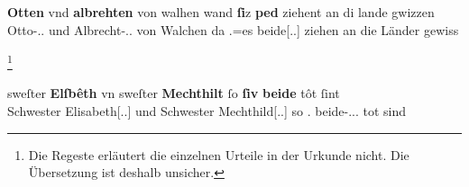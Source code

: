 \begin{exe}
\ex \label{ex:cao_samegend_beide}
\begin{xlist}

	\ex \label{ex:cao_samegend_beide_2}
		\gll \textbf{Otten} vnd \textbf{albrehten} von walhen \textelp{} wand
			\textbf{ſi}z \textbf{ped} ziehent an di lande gwizzen \\
			Otto-\Acc.\Sg.\MascM{} und Albrecht-\Acc.\Sg.\MascM{} von Walchen
			{} da \Tpl\subM.\Nom{}=es beide[\Nom.\Pl.\MascM] ziehen an die
			Länder gewiss \\
		\begin{taggedline}{\parencites(Salzburg, 1281)[\pno~491, 431.41, 432.38]{cao1}}
		\trans {}%
			\footnote{Die Regeste \autocite[80]{caor} erläutert die einzelnen
			Urteile in der Urkunde nicht. Die Übersetzung ist deshalb
			unsicher.}
		\end{taggedline}

	\ex \label{ex:cao_samegend_beide_3}
		\gll sweſter \textbf{Elſbêth} vn sweſter \textbf{Mechthilt} \textelp{} ſo
			\textbf{ſiv} \textbf{beide} tôt ſint \textelp{} \\
			Schwester Elisabeth[\Nom.\Sg.\FemF] und Schwester
			Mechthild[\Nom.\Sg.\FemF] {} so	\Tpl\subF.\Nom{}
			beide-\Nom.\Pl.\FemF.\St{} tot sind {} \\
		\begin{taggedline}{\parencites(Zürich, 1291)[\pno~1504, 679.12--13]{cao2}}
		\trans {}
		\end{taggedline}
\end{xlist}
\end{exe}

